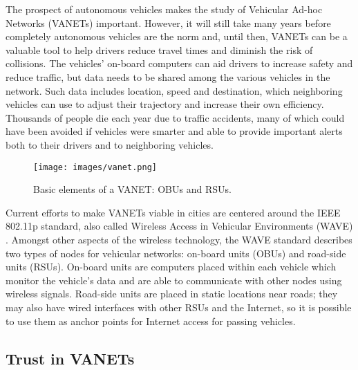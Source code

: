 \documentclass{article}
\begin{document}
The prospect of autonomous vehicles makes the study of Vehicular Ad-hoc Networks (VANETs) important.
However, it will still take many years before completely autonomous vehicles are the norm and, until then, VANETs can be a valuable tool to help drivers reduce travel times and diminish the risk of collisions.
The vehicles' on-board computers can aid drivers to increase safety and reduce traffic, but data needs to be shared among the various vehicles in the network.
Such data includes location, speed and destination, which neighboring vehicles can use to adjust their trajectory and increase their own efficiency.
Thousands of people die each year due to traffic accidents, many of which could have been avoided if vehicles were smarter and able to provide important alerts both to their drivers and to neighboring vehicles.

\begin{figure}[h]
    \centering
    \texttt{[image: images/vanet.png]}
    \caption{Basic elements of a VANET: OBUs and RSUs. \cite{saini2015close}}
    \label{fig:vanet}
\end{figure}

Current efforts to make VANETs viable in cities are centered around the IEEE 802.11p standard, also called Wireless Access in Vehicular Environments (WAVE) \cite{jiang2008ieee}.
Amongst other aspects of the wireless technology, the WAVE standard describes two types of nodes for vehicular networks: on-board units (OBUs) and road-side units (RSUs).
On-board units are computers placed within each vehicle which monitor the vehicle's data and are able to communicate with other nodes using wireless signals.
Road-side units are placed in static locations near roads; they may also have wired interfaces with other RSUs and the Internet, so it is possible to use them as anchor points for Internet access for passing vehicles.


\subsection{Trust in VANETs}
\end{document}
